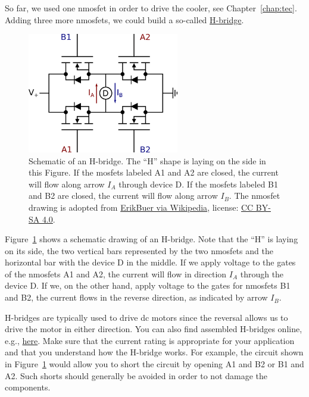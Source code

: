 So far, we used one n\ac{mosfet} in order to drive the cooler, see Chapter~\ref{chap:tec}. Adding three more n\acp{mosfet}, we could build a so-called \href{https://en.wikipedia.org/wiki/H-bridge}{H-bridge}. 
\begin{figure}[tb]
    \centering
    \includegraphics[width=250px]{graphics/06_outlook/h-bridge.png}
    \caption{Schematic of an H-bridge. The ``H'' shape is laying on the side in this Figure. If the \acp{mosfet} labeled A1 and A2 are closed, the current will flow along arrow $I_A$ through device D. If the \acp{mosfet} labeled B1 and B2 are closed, the current will flow along arrow $I_B$. The n\ac{mosfet} drawing is adopted from \href{https://en.wikipedia.org/wiki/Electronic_symbol\#/media/File:Enh_N_channel_Mosfet.svg}{ErikBuer via Wikipedia}, license: \href{https://creativecommons.org/licenses/by-sa/4.0/}{CC BY-SA 4.0}.}
    \label{fig:outlook:h-bridge}
\end{figure}
Figure~\ref{fig:outlook:h-bridge} shows a schematic drawing of an H-bridge. Note that the 
``H'' is laying on its side, the two vertical bars represented by the two n\acp{mosfet} and the horizontal bar with the device D in the middle. If we apply voltage to the gates of the n\acp{mosfet} A1 and A2, the current will flow in direction $I_A$ through the device D. If we, on the other hand, apply voltage to the gates for n\acp{mosfet} B1 and B2, the current flows in the reverse direction, as indicated by arrow $I_B$. 

H-bridges are typically used to drive \ac{dc} motors since the reversal allows us to drive the motor in either direction. You can also find assembled H-bridges online, e.g., \href{https://www.electronics-lab.com/project/5-amp-h-bridge-dc-motor-driver-using-mc33886/}{here}. Make sure that the current rating is appropriate for your application and that you understand how the H-bridge works. For example, the circuit shown in Figure~\ref{fig:outlook:h-bridge} would allow you to short the circuit by opening A1 and B2 or B1 and A2. Such shorts should generally be avoided in order to not damage the components.

